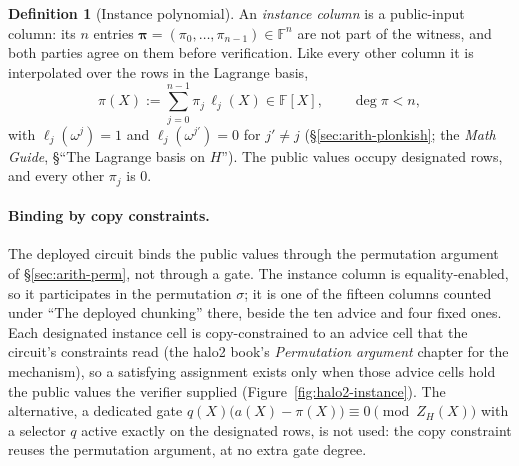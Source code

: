\documentclass[11pt,a4paper]{article}
\theoremstyle{definition}
\newtheorem{definition}[theorem]{Definition}
\newcommand{\F}{\mathbb{F}}
\newcommand{\ZH}{Z_H}
\begin{document}
\begin{definition}[Instance polynomial]\label{def:halo2-instance-poly}
An \emph{instance column} is a public-input column: its $n$ entries
$\boldsymbol\pi = (\pi_0, \dots, \pi_{n-1}) \in \F^{n}$ are not part of
the witness, and both parties agree on them before verification. Like
every other column it is interpolated over the rows in the Lagrange basis,
\[
\pi(X) := \sum_{j=0}^{n-1} \pi_j\,\ell_j(X) \in \F[X], \qquad
\deg \pi < n,
\]
with $\ell_j(\omega^{j}) = 1$ and $\ell_j(\omega^{j'}) = 0$ for $j' \ne j$
(\S\ref{sec:arith-plonkish}; the \emph{Math Guide}, \S``The Lagrange basis
on $H$''). The public values occupy designated rows, and every other
$\pi_j$ is $0$.
\end{definition}

\paragraph{Binding by copy constraints.}
The deployed circuit binds the public values through the permutation
argument of \S\ref{sec:arith-perm}, not through a gate. The instance
column is equality-enabled, so it participates in the permutation
$\sigma$; it is one of the fifteen columns counted under ``The deployed
chunking'' there, beside the ten advice and four fixed ones. Each
designated instance cell is copy-constrained to an advice cell that the
circuit's constraints read (the halo2 book's \emph{Permutation argument}
chapter for the mechanism), so a satisfying assignment exists only when
those advice cells hold the public values the verifier supplied
(Figure~\ref{fig:halo2-instance}). The alternative, a dedicated gate
$q(X)\bigl(a(X) - \pi(X)\bigr) \equiv 0 \pmod{\ZH(X)}$ with a selector
$q$ active exactly on the designated rows, is not used: the copy
constraint reuses the permutation argument, at no extra gate degree.
\end{document}
